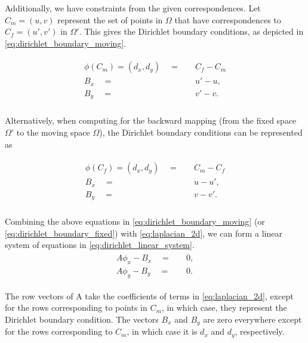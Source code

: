 \documentclass[lettersize,journal]{IEEEtran}
\begin{document}
Additionally, we have constraints from the given correspondences. Let $C_m = (u, v)$ represent the set of points in $\Omega$ that have correspondences to $C_f = (u', v')$ in $\Omega'$. This gives the Dirichlet boundary conditions, as depicted in \autoref{eq:dirichlet_boundary_moving}.

\begin{align} \label{eq:dirichlet_boundary_moving}
    \begin{split}
    \phi(C_m)  =  (d_x, d_y) \quad = \quad & C_f - C_m \\
    B_x \quad = \quad &  u' - u, \\
    B_y \quad = \quad &  v' - v. \\
    \end{split}
\end{align}

Alternatively, when computing for the backward mapping (from the fixed space $\Omega'$ to the moving space $\Omega$), the Dirichlet boundary conditions can be represented as

\begin{align} \label{eq:dirichlet_boundary_fixed}
    \begin{split}
    \phi(C_f)  =  (d_x, d_y) \quad = \quad & C_m - C_f \\
    B_x \quad = \quad &  u - u', \\
    B_y \quad = \quad &  v - v'. \\
    \end{split}
\end{align}

Combining the above equations in \autoref{eq:dirichlet_boundary_moving} (or \autoref{eq:dirichlet_boundary_fixed}) with \autoref{eq:laplacian_2d}, we can form a linear system of equations in \autoref{eq:dirichlet_linear_system}.
\begin{align} \label{eq:dirichlet_linear_system}
    \begin{split}
    A\phi_x - B_x \quad = \quad & 0, \\
    A\phi_y - B_y \quad = \quad & 0.
    \end{split}
\end{align}   


The row vectors of A take the coefficients of terms in \autoref{eq:laplacian_2d}, except for the rows corresponding to points in $C_m$, in which case, they represent the Dirichlet boundary condition. The vectors $B_x$ and $B_y$ are zero everywhere except for the rows corresponding to $C_m$, in which case it is $d_x$ and $d_y$, respectively. 
\end{document}
